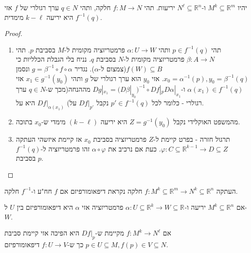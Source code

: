 \documentclass{tstextbook}
\begin{document}
\begin{theorem}
יהיו \(M^{k}\subseteq \mathbb{R}^{m}\) ו-\(N^{\ell}\subseteq \mathbb{R}^{n}\) יריעות. תהי \(f:M\to N\) חלקה, ותהי \(q \in N\) ערך רגולרי של \(f\) אזי \(f ^{-1}(q)\) היא יריעה \(k-\ell\) מימדית.

\end{theorem}
\begin{proof}
  \begin{enumerate}
    \item תהי \(p \in f^{-1}(q)\) ותהי \(\alpha:U\to W\) פרמטריזציה מקומית ל-\(M\) בסביבת \(p\). תהי \(\beta:A\to N\) פרמטריזציה מקומית ל-\(N\) בסביבת \(q\). נניח בלי הגבלת הכלליות כי \(f(W)\subseteq B\)(צמצום ל-\(\alpha\)). נגדיר \(g=\beta ^{-1} \circ f \circ \alpha\) ונסמן \(x_{0} = \alpha ^{-1}(p),y_{0}=\beta ^{-1}(q)\). אזי \(y_{0}\) הוא ערך רגולרי של \(g\) ותהי \(x_{1} \in g^{-1}(y_{0})\) אזי \(\alpha(x_{1})\in f^{-1}(q)\) ו-\(Dg|_{x_{1}}=(D\beta|_{y_{0}})^{-1}\circ Df|_{p}D\alpha|_{x_{1}}\) מההנחה(מכך ש-\(q \in N\) ערך רגולרי - כלומר לכל \(p' \in f^{-1}(q)\) נקבל \(Df|_{p'}\) על) \(Df|_{\alpha(x_{1})}\) היא על. 


    \item מהמשפט האוקלידי נקבל \(Z=g^{-1}(y_{0})\) היא יריעה \((k-\ell)\) מימדי ש-\(x_{0}\) בתוכה. 


    \item תרגול חזרה - בפרט קיימת ל-\(Z\) פרמטריזציה בסביבת \(x_{0}\) אז קיימת איזשהי העתקה \(\varphi:C\subseteq \mathbb{R}^{k-1}\to D\subseteq Z\). כעת אם נרכיב את \(\alpha \circ \varphi\) זהו פרמטריזציה ל-\(f^{-1}(q)\) בסביבת \(p\). 


  \end{enumerate}
\end{proof}
\begin{definition}[דיפאומורפיזם ]
העתקה \(f:M^{k}\subseteq \mathbb{R}^{m}\to N^{k}\subseteq \mathbb{R}^{n}\) חלקה נקראת דיפאומורפיזם אם \(f\) חח"ע ו-\(f^{-1}\) חלקה.

\end{definition}
\begin{example}
אם \(M^{k}\subseteq \mathbb{R}^{n}\) יריעה ו-\(\alpha:U\subseteq \mathbb{R}^{k}\to W\subseteq \mathbb{R}^{}\) פרמטריזציה אזי \(\alpha\) היא דיפאומורפיזם בין \(U\) ל-\(W\).

\end{example}
\begin{example}
אם \(f:M^{k}\to N^{\ell}\) מקיימת ש-\(Df|_{p}\) היא הפיכה אזי קיימת סביבת \(p \in U\subseteq M,f(p)\in V\subseteq N\) כך ש-\(f:U\to V\) דיפאומורפיזם.

\end{example}
\end{document}
